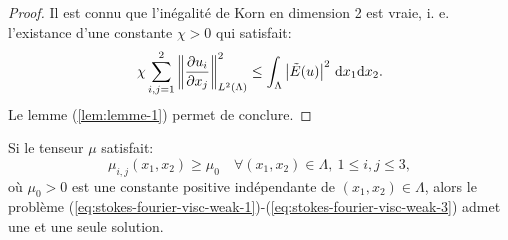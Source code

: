 \begin{proof}
  Il est connu que l'inégalité de Korn en dimension 2 est vraie,
  i. e. l'existance d'une constante $\chi > 0$ qui satisfait:
  \begin{equation}
    \chi \sum_{i,j = 1}^2\norm{\frac{\partial u_i}{\partial x_j}}^2_{L^2(\Lambda)} %
    \leq \int_\Lambda \abs{\tilde E(u)}^2\,\mathrm dx_1\mathrm dx_2.
  \end{equation}
  Le lemme (\ref{lem:lemme-1}) permet de conclure.
\end{proof}

\begin{proposition}\label{prop:proposition-2}
  Si le tenseur $\mu$ satisfait:
  \begin{equation}\label{eq:prop-2-hypothesis}
    \mu_{i,j}(x_1, x_2) \geq \mu_0 \quad \forall (x_1, x_2)\in \Lambda,\ 1\leq i,j\leq 3,
  \end{equation}
  où $\mu_0 > 0$ est une constante positive indépendante de $(x_1,
  x_2)\in\Lambda$, alors le problème
  (\ref{eq:stokes-fourier-visc-weak-1})-(\ref{eq:stokes-fourier-visc-weak-3})
  admet une et une seule solution.
\end{proposition}

